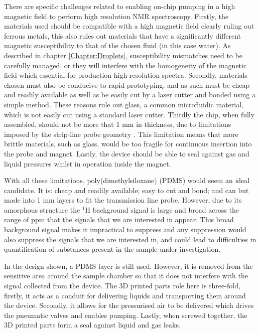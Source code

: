 There are specific challenges related to enabling on-chip pumping in a high magnetic field to perform high
resolution NMR spectroscopy. Firstly, the materials used should be compatible with a high
magnetic field clearly ruling out ferrous metals, this also rules out materials that
have a significantly different magnetic susceptibility to that of the chosen fluid (in this
case water). As described in chapter \ref{Chapter:Droplets}, susceptibility mismatches need to be carefully
managed, or they will interfere with the homogeneity of the magnetic field which
essential for production high resolution spectra. Secondly, materials chosen must also be
conducive to rapid prototyping, and as such must be cheap and readily available as well as
be easily cut by a laser cutter and bonded using a simple method. These reasons rule out
glass, a common microfluidic material, which is not easily cut using a standard
laser cutter. Thirdly the chip, when fully assembled, should not be more
that 1 mm in thickness, due to limitations imposed by the strip-line probe geometry \citep{sharma2019modular}. This
limitation  means that more brittle materials, such as glass, would be too fragile for
continuous insertion into the probe and magnet. Lastly,
the device should be able to seal against gas and liquid pressures whilst in operation
inside the magnet.

With all these limitations, poly(dimethylsiloxane) (PDMS) would seem an ideal candidate. It is: cheap and
readily available; easy to cut and bond; and can but made into 1 mm layers to fit the
transmission line probe. However, due to its amorphous structure the $^1$H background
signal is large and broad across the range of ppm that the signals that we are interested in
appear. This broad background signal makes it impractical to suppress and any suppression would also suppress the
signals that we are interested in, and could lead to difficulties in quantification of
substances present in the sample under investigation.

In the design shown, a PDMS layer is still used. However, it is removed from the
sensitive area around the sample chamber so that it does not interfere with the signal
collected from the device. The 3D printed parts role here is three-fold, firstly, it acts
as a conduit for delivering liquids and transporting them around the device. Secondly, it
allows for the pressurised air to be delivered which drives the pneumatic valves and
enables pumping. Lastly, when screwed together, the 3D printed parts form a seal against
liquid and gas leaks.

